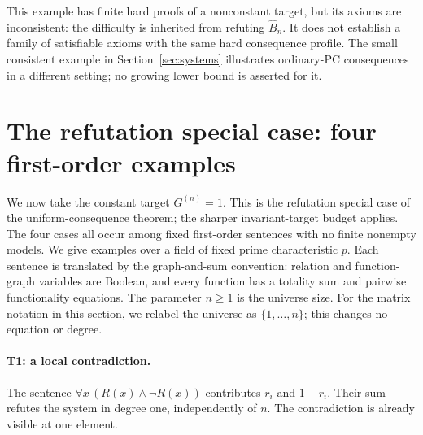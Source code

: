 \documentclass[11pt,a4paper]{article}
\theoremstyle{definition}\newtheorem{definition}[theorem]{Definition}
\theoremstyle{remark}\newtheorem{remark}[theorem]{Remark}
\begin{document}
This example has finite hard proofs of a nonconstant target, but its
axioms are inconsistent: the difficulty is inherited from refuting
$\widehat B_n$. It does not establish a family of satisfiable axioms
with the same hard consequence profile. The small consistent example
in Section~\ref{sec:systems} illustrates ordinary-PC consequences in
a different setting; no growing lower bound is asserted for it.

\section{The refutation special case: four first-order examples}
\label{sec:examples}

We now take the constant target $G^{(n)}=1$. This is the refutation special
case of the uniform-consequence theorem; the sharper invariant-target
budget applies. The four cases all occur among fixed first-order sentences with no finite
nonempty models. We give examples over a field of fixed prime characteristic
$p$. Each sentence is translated by the graph-and-sum convention: relation
and function-graph variables are Boolean, and every function has a totality
sum and pairwise functionality equations. The parameter $n\geq1$ is the
universe size. For the matrix notation in this section, we relabel the
universe as $\{1,\ldots,n\}$; this changes no equation or degree.

\paragraph{T1: a local contradiction.}
The sentence $\forall x\,(R(x)\wedge\neg R(x))$ contributes $r_i$ and
$1-r_i$. Their sum refutes the system in degree one, independently of $n$.
The contradiction is already visible at one element.
\end{document}
